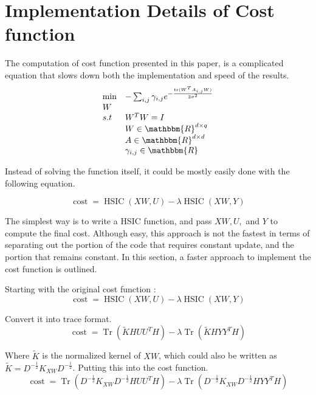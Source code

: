 \documentclass{article}
\newcommand{\nocomma}{}
\newcommand{\tmop}[1]{\ensuremath{\operatorname{#1}}}
\begin{document}
\section{Implementation Details of Cost function}



The computation of cost function presented in this paper, is a complicated
equation that slows down both the implementation and speed of the results.
\begin{equation}
  \begin{array}{ll}
    \min & - \sum_{i, j} \gamma_{i, j} e^{- \frac{\tmop{tr} ( W^T A_{i, j}
    W)}{2 \sigma^2}}\\
    W & \\
    s.t & W^T W = I\\
    & W \in \mathbbm{R}^{d \times q}\\
    & A \in \mathbbm{R}^{d \times d}\\
    & \gamma_{i, j} \in \mathbbm{R}
  \end{array}
\end{equation}


Instead of solving the function itself, it could be mostly easily done with
the following equation.


\[ \tmop{cost} = \tmop{HSIC} ( X W, U) - \lambda \tmop{HSIC} ( X W, Y) \]


The simplest way is to write a HSIC function, and pass $X W \nocomma, U,$ and
$Y$ to compute the final cost. Although easy, this approach is not the fastest
in terms of separating out the portion of the code that requires constant
update, and the portion that remains constant. In this section, a faster
approach to implement the cost function is outlined.



Starting with the original cost function :
\[ \tmop{cost} = \tmop{HSIC} ( X W, U) - \lambda \tmop{HSIC} ( X W, Y) \]


Convert it into trace format.
\[ \tmop{cost} = \tmop{Tr} ( \tilde{K} H U U^T H) - \lambda \tmop{Tr} (
   \tilde{K} H Y Y^T H) \]


Where $\tilde{K}$ is the normalized kernel of $X W$, which could also be
written as $\tilde{K} = D^{- \frac{1}{2}} K_{X W} D^{- \frac{1}{2}}$. Putting
this into the cost function.
\[ \tmop{cost} = \tmop{Tr} \left( D^{- \frac{1}{2}} K_{X W} D^{- \frac{1}{2}}
   H U U^T H \right) - \lambda \tmop{Tr} \left( D^{- \frac{1}{2}} K_{X W} D^{-
   \frac{1}{2}} H Y Y^T H \right) \]
\end{document}
